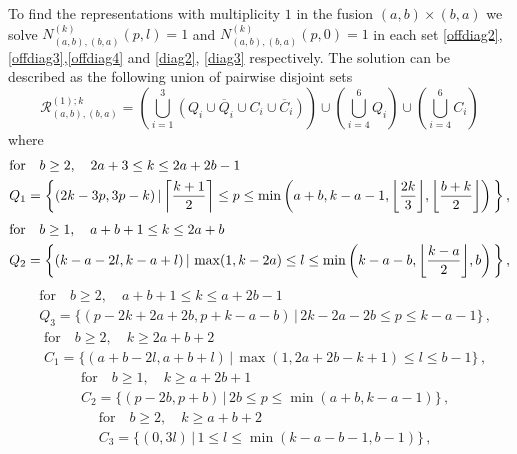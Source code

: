 \documentclass[a4paper,11pt]{article}
\DeclarePairedDelimiter\ceil{\lceil}{\rceil}
\DeclarePairedDelimiter\floor{\lfloor}{\rfloor}
\theoremstyle{plain}
\theoremstyle{definition}
\begin{document}
To find the representations with multiplicity $1$ in the fusion $(a,b)\times (b,a)$ we solve $N^{(k)}_{(a,b),(b,a)}(p,l)=1$ and $N^{(k)}_{(a,b),(b,a)}(p,0)=1$ in each set \eqref{offdiag2}, \eqref{offdiag3},\eqref{offdiag4} and \eqref{diag2}, \eqref{diag3} respectively. 
The solution can be described as the following   union of pairwise disjoint sets 
\begin{equation}\label{fullmult1}
    \mathcal{R}^{(1);k}_{(a,b),(b,a)}= \left(\bigcup_{i=1}^3 \left( Q_i\cup \overline{Q}_i\cup C_i\cup \overline{C}_i\right) \right)\cup \left(\bigcup_{i=4}^6 Q_i\right)\cup \left(\bigcup_{i=4}^6 C_i\right)
\end{equation}
where
\begin{align}\label{d1}
        &\text{for}\quad b\geq 2, \quad 2a+3\leq k\leq 2a+2b-1 \nonumber \\
        &Q_1=\bigg\{(2k-3p,3p-k)\,|\, \ceil*{\frac{k+1}{2}}\leq p\leq \operatorname{min}\left(a+b,k-a-1,\floor*{\frac{2k}{3}},\floor*{\frac{b+k}{2}}\right)\bigg\}\,,
    \end{align}
    \begin{align}\label{d2}
        &\text{for}\quad  b\geq 1, \quad a+b+1\leq k\leq 2a+b \nonumber \\
        &Q_2=\bigg\{(k-a-2l,k-a+l)\,|\, \operatorname{max}(1,k-2a)\leq l\leq \operatorname{min}\left(k-a-b,\floor*{\frac{k-a}{2}},b\right)\bigg\}\,,
    \end{align}
 \begin{align}\label{d3}
        &\text{for}\quad b\geq 2, \quad a+b+1\leq k\leq a+2b-1 \nonumber \\
        &Q_3=\{(p-2k+2a+2b,p+k-a-b)\,|\, 2k-2a-2b\leq p\leq k-a-1\}\,,
    \end{align}
     \begin{align}\label{c1}
        &\text{for}\quad b\geq 2, \quad  k\geq 2a+b+2 \nonumber \\
        &C_1=\{(a+b-2l,a+b+l)\,|\, \operatorname{max}(1,2a+2b-k+1)\leq l \leq b-1\}\,,
    \end{align}
     \begin{align}\label{c2}
        &\text{for}\quad b\geq 1, \quad k\geq a+2b+1 \nonumber \\
        &C_2=\{(p-2b,p+b)\,|\, 2b\leq p\leq \operatorname{min}(a+b,k-a-1)\}\,,
    \end{align}
     \begin{align}\label{c3}
        &\text{for}\quad b\geq 2, \quad  k\geq a+b+2 \nonumber \\
        &C_3=\{(0,3l)\,|\, 1\leq l\leq \operatorname{min}\left(k-a-b-1,b-1\right)\}\,,
    \end{align}
\end{document}
